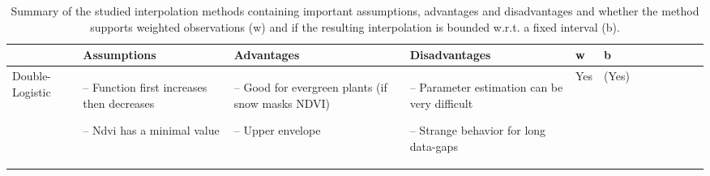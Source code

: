 \begin{table}[!ht]
	\centering
	\caption[skip=10pt]{Summary of the studied interpolation methods containing important assumptions, advantages and disadvantages and whether the method supports weighted observations (w) and if the resulting interpolation is bounded w.r.t. a fixed interval (b).}
	\small
	\begin{tabular}{p{1.6cm}p{3.3cm}p{3.3cm}p{3.4cm}p{0.4cm}p{0.4cm}p{3cm}p{3cm}p{3cm}p{3cm}p{2.7cm}p{3cm}|}
		\toprule
		~                                                                                                                                                            &
		\textbf{Assumptions}                                                                                                                                         &
		\textbf{Advantages}                                                                                                                                                &
		\textbf{Disadvantages}                                                                                                                                                &
		\textbf{w}                                                                                                                                      &
		\textbf{b}                                                                                                                                        \\ \hline

		Double-Logistic                                                                                                                                              &
		\begin{cptitemize} \item[--]  Function first increases then decreases \item[--]  Ndvi has a minimal value                            \end{cptitemize}        &
		\begin{cptitemize} \item[--]  Good for evergreen plants (if snow masks NDVI) \item[--]  Upper envelope                                \end{cptitemize}        &
		\begin{cptitemize} \item[--]  Parameter estimation can be very difficult \item[--]  Strange behavior for long data-gaps             \end{cptitemize}        &
		Yes                                                                                                                                                          &
		(Yes)                                                                                                                                                         \\ \hline%


\end{tabular}
\end{table}
